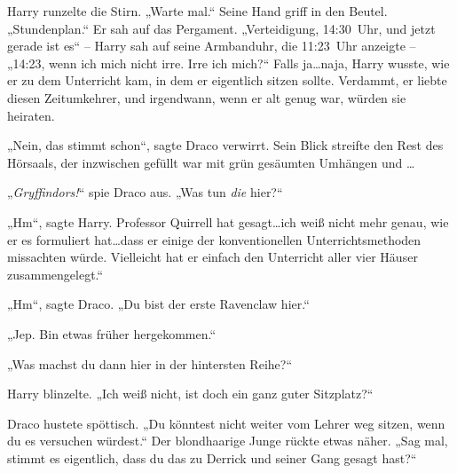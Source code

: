 Harry runzelte die Stirn. „Warte mal.“ Seine Hand griff in den Beutel. „Stundenplan.“ Er sah auf das Pergament. „Verteidigung, 14:30~Uhr, und jetzt gerade ist es“ – Harry sah auf seine Armbanduhr, die 11:23~Uhr anzeigte – „14:23, wenn ich mich nicht irre. Irre ich mich?“ Falls ja…naja, Harry wusste, wie er zu dem Unterricht kam, in dem er eigentlich sitzen sollte. Verdammt, er liebte diesen Zeitumkehrer, und irgendwann, wenn er alt genug war, würden sie heiraten.

„Nein, das stimmt schon“, sagte Draco verwirrt. Sein Blick streifte den Rest des Hörsaals, der inzwischen gefüllt war mit grün gesäumten Umhängen und …

„\emph{Gryffindors!}“ spie Draco aus. „Was tun \emph{die} hier?“

„Hm“, sagte Harry. Professor Quirrell hat gesagt…ich weiß nicht mehr genau, wie er es formuliert hat…dass er einige der konventionellen Unterrichtsmethoden missachten würde. Vielleicht hat er einfach den Unterricht aller vier Häuser zusammengelegt.“

„Hm“, sagte Draco. „Du bist der erste Ravenclaw hier.“

„Jep. Bin etwas früher hergekommen.“

„Was machst du dann hier in der hintersten Reihe?“

Harry blinzelte. „Ich weiß nicht, ist doch ein ganz guter Sitzplatz?“

Draco hustete spöttisch. „Du könntest nicht weiter vom Lehrer weg sitzen, wenn du es versuchen würdest.“ Der blondhaarige Junge rückte etwas näher. „Sag mal, stimmt es eigentlich, dass du das zu Derrick und seiner Gang gesagt hast?“

